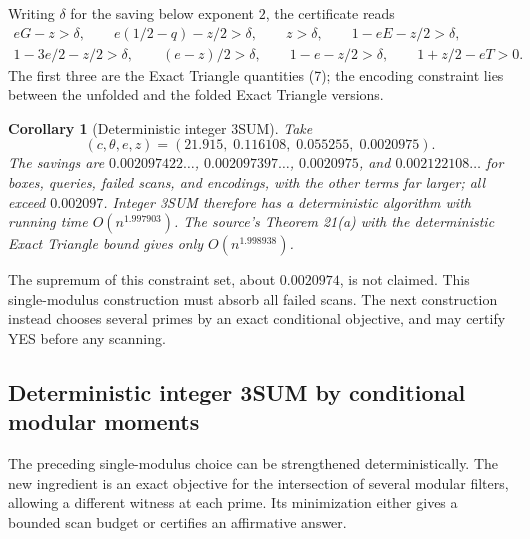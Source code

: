 \documentclass[11pt]{article}
\newtheorem{corollary}[theorem]{Corollary}
\begin{document}
Writing $\delta$ for the saving below exponent $2$, the certificate reads
\begin{gather*}
eG-z>\delta,\qquad e(1/2-q)-z/2>\delta,\qquad z>\delta,\qquad
1-eE-z/2>\delta,\\
1-3e/2-z/2>\delta,\qquad (e-z)/2>\delta,\qquad 1-e-z/2>\delta,\qquad
1+z/2-eT>0.
\end{gather*}
The first three are the Exact Triangle quantities (7); the encoding
constraint lies between the unfolded and the folded Exact Triangle versions.
\begin{corollary}[Deterministic integer 3SUM]
Take
\[
(c,\theta,e,z)=(21.915,\;0.116108,\;0.055255,\;0.0020975).
\]
The savings are $0.002097422\ldots$, $0.002097397\ldots$, $0.0020975$, and
$0.002122108\ldots$ for boxes, queries, failed scans, and encodings, with
the other terms far larger; all exceed $0.002097$. Integer 3SUM therefore
has a deterministic algorithm with running time $O(n^{1.997903})$. The
source's Theorem 21(a) with the deterministic Exact Triangle bound gives
only $O(n^{1.998938})$.
\end{corollary}
The supremum of this constraint set, about $0.0020974$, is not claimed.
This single-modulus construction must absorb all failed scans. The next
construction instead chooses several primes by an exact conditional
objective, and may certify YES before any scanning.

\subsection*{Deterministic integer 3SUM by conditional modular moments}
The preceding single-modulus choice can be strengthened deterministically.
The new ingredient is an exact objective for the intersection of several
modular filters, allowing a different witness at each prime. Its minimization
either gives a bounded scan budget or certifies an affirmative answer.
\end{document}
